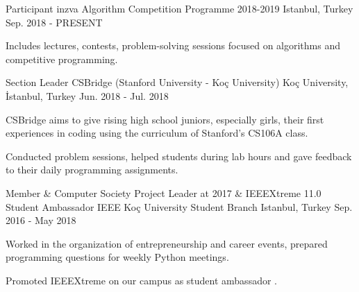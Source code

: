 
\vspace*{-1.5mm}

\begin{cventries}

  \cventry
    {Participant} %
    {inzva Algorithm Competition Programme 2018-2019} %
    {Istanbul, Turkey} %
    {Sep. 2018 - PRESENT} %
    {
      \begin{cvitems} %
        \item {Includes lectures, contests, problem-solving sessions focused on algorithms and competitive programming.}
      \end{cvitems}
    }

    
    \cventry
    {Section Leader}%
    {CSBridge (Stanford University - Koç University)}%
    {Koç University, İstanbul, Turkey}
    {Jun. 2018 - Jul. 2018}
    {
      \begin{cvitems}
        \item {CSBridge aims to give rising high school juniors, especially girls, their first experiences in coding using the curriculum of Stanford's CS106A class.} 	             
        \item{Conducted problem sessions, helped students during lab hours and gave feedback to their daily programming assignments.}
      \end{cvitems}
    }

  \cventry
    {Member \& Computer Society Project Leader at 2017 \& IEEEXtreme 11.0 Student Ambassador}
    {IEEE Koç University Student Branch}
    {Istanbul, Turkey}
    {Sep. 2016 - May 2018}
    {
      \begin{cvitems}
        \item {Worked in the organization of entrepreneurship and career events, prepared programming questions for weekly Python meetings.}
        \item {Promoted IEEEXtreme on our campus as student ambassador .}
      \end{cvitems}
    }

\end{cventries}
